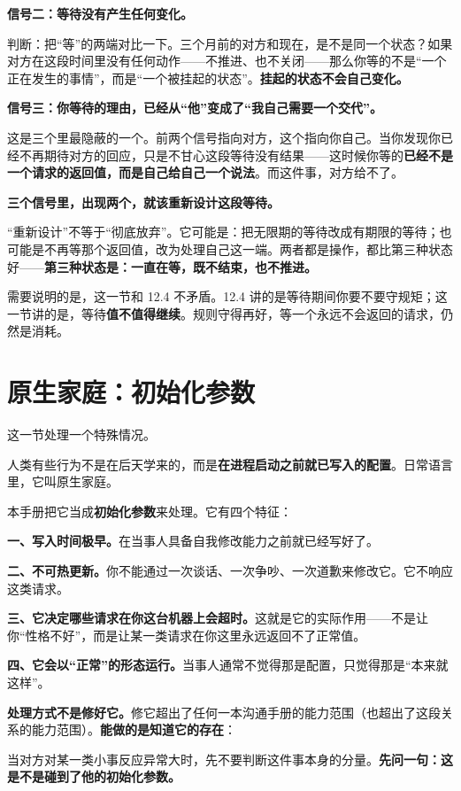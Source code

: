 \textbf{信号二：等待没有产生任何变化。}

判断：把“等”的两端对比一下。三个月前的对方和现在，是不是同一个状态？如果对方在这段时间里没有任何动作——不推进、也不关闭——那么你等的不是“一个正在发生的事情”，而是“一个被挂起的状态”。\textbf{挂起的状态不会自己变化。}

\textbf{信号三：你等待的理由，已经从“他”变成了“我自己需要一个交代”。}

这是三个里最隐蔽的一个。前两个信号指向对方，这个指向你自己。当你发现你已经不再期待对方的回应，只是不甘心这段等待没有结果——这时候你等的\textbf{已经不是一个请求的返回值，而是自己给自己一个说法}。而这件事，对方给不了。

\textbf{三个信号里，出现两个，就该重新设计这段等待。}

“重新设计”不等于“彻底放弃”。它可能是：把无限期的等待改成有期限的等待；也可能是不再等那个返回值，改为处理自己这一端。两者都是操作，都比第三种状态好——\textbf{第三种状态是：一直在等，既不结束，也不推进。}

需要说明的是，这一节和 12.4 不矛盾。12.4 讲的是等待期间你要不要守规矩；这一节讲的是，等待\textbf{值不值得继续}。规则守得再好，等一个永远不会返回的请求，仍然是消耗。

\section{原生家庭：初始化参数}

这一节处理一个特殊情况。

人类有些行为不是在后天学来的，而是\textbf{在进程启动之前就已写入的配置}。日常语言里，它叫原生家庭。

本手册把它当成\textbf{初始化参数}来处理。它有四个特征：

\textbf{一、写入时间极早。}在当事人具备自我修改能力之前就已经写好了。

\textbf{二、不可热更新。}你不能通过一次谈话、一次争吵、一次道歉来修改它。它不响应这类请求。

\textbf{三、它决定哪些请求在你这台机器上会超时。}这就是它的实际作用——不是让你“性格不好”，而是让某一类请求在你这里永远返回不了正常值。

\textbf{四、它会以“正常”的形态运行。}当事人通常不觉得那是配置，只觉得那是“本来就这样”。

\textbf{处理方式不是修好它。}修它超出了任何一本沟通手册的能力范围（也超出了这段关系的能力范围）。\textbf{能做的是知道它的存在}：

\begin{mdquote}
当对方对某一类小事反应异常大时，先不要判断这件事本身的分量。\textbf{先问一句：这是不是碰到了他的初始化参数。}
\end{mdquote}

